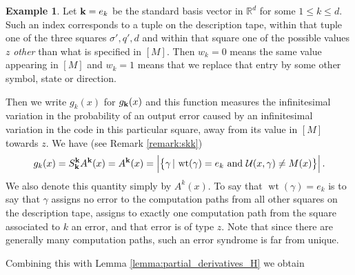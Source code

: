 \documentclass[english,letter paper,12pt,reqno]{article}
\theoremstyle{definition}
\newtheorem{example}[theorem]{Example}
\def\l{\,|\,}
\begin{document}
\begin{example}\label{example:weight_one_error}
Let $\bold{k} = e_k$ be the standard basis vector in $\mathbb{R}^d$ for some $1 \le k \le d$. Such an index corresponds to a tuple on the description tape, within that tuple one of the three squares $\sigma', q', d$ and within that square one of the possible values $z$ \emph{other} than what is specified in $[M]$. Then $w_k = 0$ means the same value appearing in $[M]$ and $w_k = 1$ means that we replace that entry by some other symbol, state or direction.

Then we write $g_k(x)$ for $g_{\bold{k}}(x)$ and this function measures the infinitesimal variation in the probability of an output error caused by an infinitesimal variation in the code in this particular square, away from its value in $[M]$ towards $z$. We have (see Remark \ref{remark:skk})
\begin{align*}
g_k(x) = S^{\bold{k}}_{\bold{k}} A^{\bold{k}}(x) = A^{\bold{k}}(x) = \Big| \big\{ \gamma \l \operatorname{wt}(\gamma) = e_k \text{ and } \mathcal{U}(x,\gamma) \neq M(x) \big\} \Big|\,.
\end{align*}
We also denote this quantity simply by $A^k(x)$. To say that $\operatorname{wt}(\gamma) = e_k$ is to say that $\gamma$ assigns no error to the computation paths from all other squares on the description tape, assigns to exactly one computation path from the square associated to $k$ an error, and that error is of type $z$. Note that since there are generally many computation paths, such an error syndrome is far from unique.
\end{example}

Combining this with Lemma \ref{lemma:partial_derivatives_H} we obtain
\end{document}
